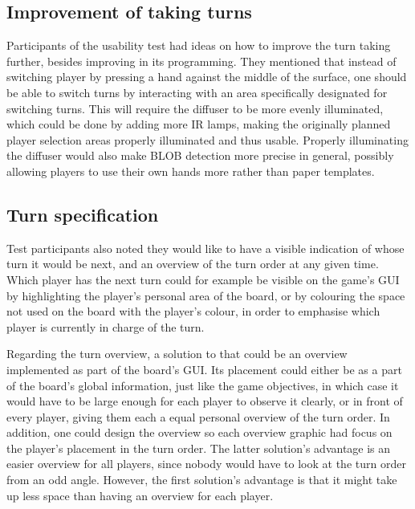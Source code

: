 \subsection{Improvement of taking turns}
Participants of the usability test had ideas on how to improve the turn taking further, besides improving in its programming. They mentioned that instead of switching player by pressing a hand against the middle of the surface, one should be able to switch turns by interacting with an area specifically designated for switching turns. This will require the diffuser to be more evenly illuminated, which could be done by adding more IR lamps, making the originally planned player selection areas properly illuminated and thus usable. Properly illuminating the diffuser would also make BLOB detection more precise in general, possibly allowing players to use their own hands more rather than paper templates.

\subsection{Turn specification}
Test participants also noted they would like to have a visible indication of whose turn it would be next, and an overview of the turn order at any given time. Which player has the next turn could for example be visible on the game's GUI by highlighting the player's personal area of the board, or by colouring the space not used on the board with the player's colour, in order to emphasise which player is currently in charge of the turn.

Regarding the turn overview, a solution to that could be an overview implemented as part of the board's GUI. Its placement could either be as a part of the board's global information, just like the game objectives, in which case it would have to be large enough for each player to observe it clearly, or in front of every player, giving them each a equal personal overview of the turn order. In addition, one could design the overview so each overview graphic had focus on the player's placement in the turn order. The latter solution's advantage is an easier overview for all players, since nobody would have to look at the turn order from an odd angle. However, the first solution's advantage is that it might take up less space than having an overview for each player.

